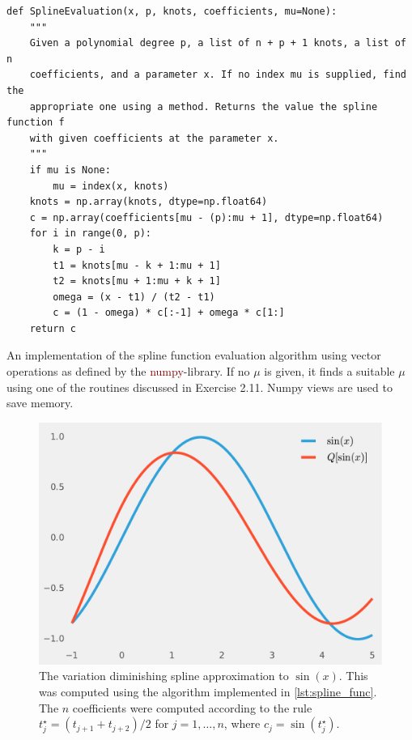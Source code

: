 \documentclass[a4paper]{article}
\renewcommand{\texttt}[1]{\textcolor{Maroon}{#1}}
\begin{document}
    \begin{listing}
        \begin{verbatim}
def SplineEvaluation(x, p, knots, coefficients, mu=None):
    """
    Given a polynomial degree p, a list of n + p + 1 knots, a list of n
    coefficients, and a parameter x. If no index mu is supplied, find the
    appropriate one using a method. Returns the value the spline function f
    with given coefficients at the parameter x.
    """
    if mu is None:
        mu = index(x, knots)
    knots = np.array(knots, dtype=np.float64)
    c = np.array(coefficients[mu - (p):mu + 1], dtype=np.float64)
    for i in range(0, p):
        k = p - i
        t1 = knots[mu - k + 1:mu + 1]
        t2 = knots[mu + 1:mu + k + 1]
        omega = (x - t1) / (t2 - t1)
        c = (1 - omega) * c[:-1] + omega * c[1:]
    return c
        \end{verbatim}
        \caption{An implementation of the spline function evaluation algorithm
        using vector operations as defined by the \texttt{numpy}-library. If no
    $\mu$ is given, it finds a suitable $\mu$ using one of the routines
discussed in Exercise 2.11. Numpy views are used to save memory.}
    \label{lst:spline_func}
    \end{listing}
    \begin{figure}[htpb]
        \centering
        \includegraphics[width=1\linewidth]{variation_diminishing_spline_approximation.pdf}
        \caption{The variation diminishing spline approximation to $\sin(x)$.
        This was computed using the algorithm implemented in
        \cref{lst:spline_func}. The $n$ coefficients were computed according to the
        rule $t_j^\star = (t_{j+1} + t_{j+2}) / 2$ for $j = 1, \ldots, n$, where $c_j = \sin(t_j^\star)$.}
        \label{fig:variation_dim}
    \end{figure}
    
\end{document}
